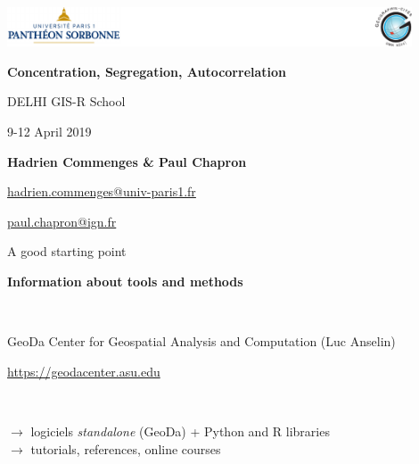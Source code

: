 \graphicspath{{IMAGE/}}

\begin{frame}

\includegraphics[width=12cm]{Logos.pdf}

\vfill

\begin{center}

\vspace*{1.5cm}

\LARGE
\textbf{Concentration, Segregation, Autocorrelation}

\vspace*{1.5cm}
 DELHI GIS-R School


\large
9-12 April 2019

\vspace*{1.5cm}


\textbf{Hadrien Commenges \& Paul Chapron}

{\small

\vspace*{0.1cm}

\url{hadrien.commenges@univ-paris1.fr}

\url{paul.chapron@ign.fr}
}

\end{center}

\end{frame}

\begin{frame}{A good starting point}

\textbf{Information about tools and methods }

~

GeoDa Center for Geospatial Analysis and Computation (Luc Anselin)

\url{https://geodacenter.asu.edu}

~

$\rightarrow$ logiciels \emph{standalone} (GeoDa) + Python and  R libraries \\
$\rightarrow$ tutorials, references, online courses


\end{frame}


